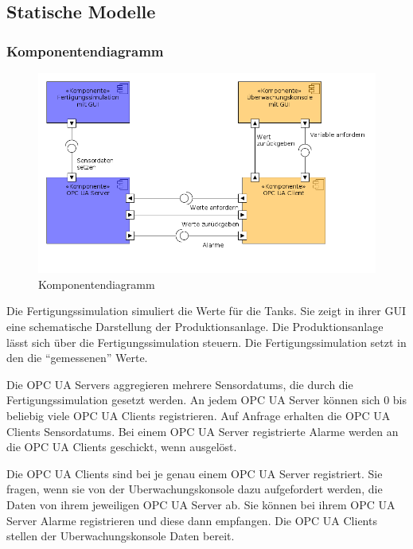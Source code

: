 \documentclass[parskip=full]{scrartcl}
\begin{document}
\subsection{Statische Modelle}
\subsubsection{Komponentendiagramm}
\begin{figure}[H]
  \centering
  \includegraphics[scale=0.5]{media/ComponentDiagram/componentDiagram.png}
  \caption{Komponentendiagramm}
\end{figure}

Die \gls{Fertigungssimulation} simuliert die Werte f\"ur die Tanks. Sie zeigt in ihrer \gls{GUI} eine schematische Darstellung der
\gls{Produktionsanlage}. Die \gls{Produktionsanlage} l\"asst sich \"uber die \gls{Fertigungssimulation} steuern. Die \gls{Fertigungssimulation} setzt
in den  die "`gemessenen"' Werte.

Die \glspl{OPC UA Server} aggregieren mehrere \glspl{Sensordatum}, die durch die \gls{Fertigungssimulation} gesetzt werden. An jedem \gls{OPC UA Server} k\"onnen
sich 0 bis beliebig viele \glspl{OPC UA Client} registrieren. Auf Anfrage erhalten die \glspl{OPC UA Client} \glspl{Sensordatum}. Bei einem \gls{OPC UA Server} registrierte
Alarme werden an die \glspl{OPC UA Client} geschickt, wenn ausgelöst.

Die \glspl{OPC UA Client} sind bei je genau einem \gls{OPC UA Server} registriert. Sie fragen, wenn sie von der \gls{Uberwachungskonsole} dazu
aufgefordert werden, die Daten von ihrem jeweiligen \gls{OPC UA Server} ab. Sie k\"onnen bei ihrem \gls{OPC UA Server} Alarme registrieren und diese
dann empfangen. Die \glspl{OPC UA Client} stellen der \gls{Uberwachungskonsole} Daten bereit.
\end{document}
